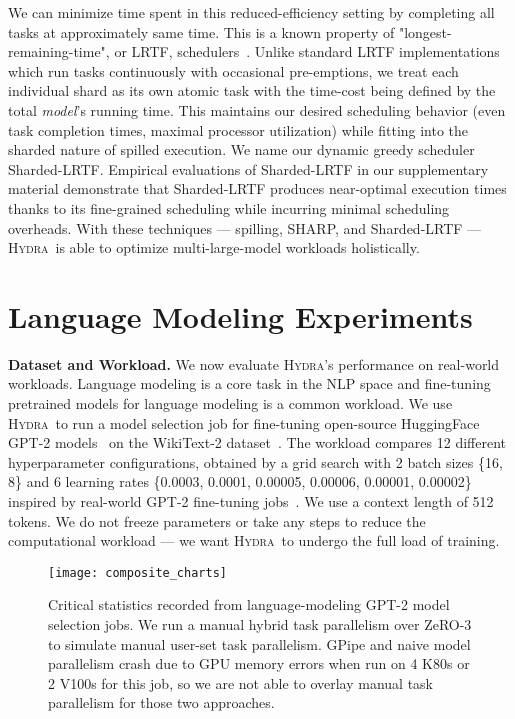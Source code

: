 \documentclass{article}
\newcommand{\system}{\textsc{Hydra}}
\begin{document}
We can minimize time spent in this reduced-efficiency setting by completing all tasks at approximately same time. This is a known property of "longest-remaining-time", or LRTF, schedulers~\cite{osbook}. Unlike standard LRTF implementations which run tasks continuously with occasional pre-emptions, we treat each individual shard as its own atomic task with the time-cost being defined by the total \textit{model}'s running time. This maintains our desired scheduling behavior (even task completion times, maximal processor utilization) while fitting into the sharded nature of spilled execution. We name our dynamic greedy scheduler Sharded-LRTF. Empirical evaluations of Sharded-LRTF in our supplementary material demonstrate that Sharded-LRTF produces near-optimal execution times thanks to its fine-grained scheduling while incurring minimal scheduling overheads. With these techniques --- spilling, SHARP, and Sharded-LRTF --- \system~is able to optimize multi-large-model workloads holistically.

\section{Language Modeling Experiments}
\label{sec:experiments}
\textbf{Dataset and Workload.} We now evaluate \system's performance on real-world workloads. Language modeling is a core task in the NLP space and fine-tuning pretrained models for language modeling is a common workload. We use \system~to run a model selection job for fine-tuning open-source HuggingFace GPT-2 models~\cite{huggingface} on the WikiText-2 dataset~\cite{wikitext2}. The workload compares 12 different hyperparameter configurations, obtained by a grid search with 2 batch sizes \{16, 8\} and 6 learning rates \{0.0003, 0.0001, 0.00005, 0.00006, 0.00001, 0.00002\} inspired by real-world GPT-2 fine-tuning jobs~\cite{hellogpt,gpt2portugal,huggingfaceexample,rutransformers}. We use a context length of 512 tokens. We do not freeze parameters or take any steps to reduce the computational workload --- we want \system~to undergo the full load of training.

\begin{figure}
\label{fig:charts}
  \centering
  \texttt{[image: composite\_charts]}
  \vspace{-4mm}
  \caption{Critical statistics recorded from language-modeling GPT-2 model selection jobs. We run a manual hybrid task parallelism over ZeRO-3 to simulate manual user-set task parallelism. GPipe and naive model parallelism crash due to GPU memory errors when run on 4 K80s or 2 V100s for this job, so we are not able to overlay manual task parallelism for those two approaches.}
\end{figure}
\end{document}
